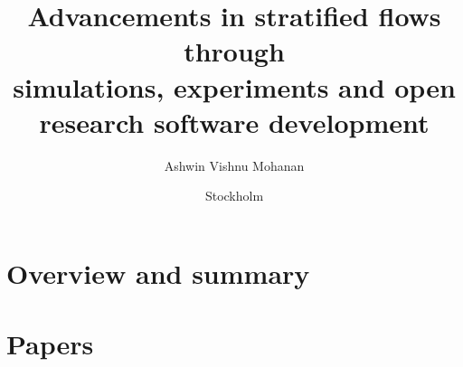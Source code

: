 \documentclass{./templates/mechthesis/MechThesis}
\title[%
  Advancements in stratified flows through simulations, experiments and open research software development%
]%
{%
  Advancements in stratified flows through \\ simulations, experiments and open
  research software development%
}%
\author{Ashwin Vishnu Mohanan}%
\affiliation
{%
	Linn\'e FLOW Centre, KTH Royal Institute of Technology, Department of Mechanics\\
	SE--100 44 Stockholm, Sweden%
}%
\date{Stockholm}{{June}}{{2019}}%
\begin{document}
%
\frontmatter



\printglossary

%
\mainmatter


\part{Overview and summary}

%
\begin{refsection}
  
\end{refsection}

%
\tocpagebreak


%
\part{Papers}

%
\makepapersummary
\cleardoublepage

%


\begin{refsection}
 
\end{refsection}

\begin{refsection}
 
\end{refsection}

\begin{refsection}
 
\end{refsection}
\end{document}
